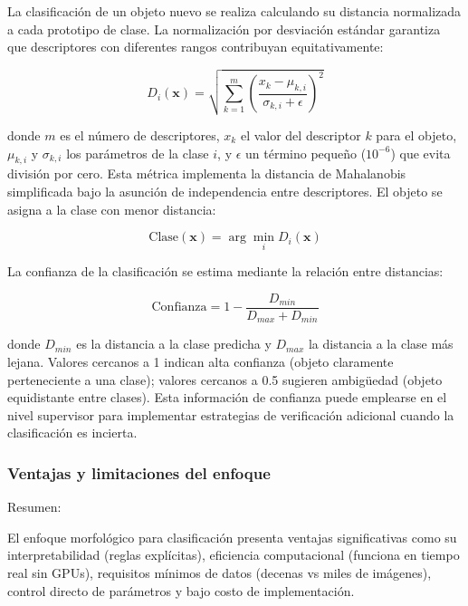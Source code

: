 La clasificación de un objeto nuevo se realiza calculando su distancia normalizada a cada prototipo de clase. La normalización por desviación estándar garantiza que descriptores con diferentes rangos contribuyan equitativamente:

\begin{equation}
D_i(\mathbf{x}) = \sqrt{\sum_{k=1}^{m} \left(\frac{x_k - \mu_{k,i}}{\sigma_{k,i} + \epsilon}\right)^2}
\end{equation}

donde $m$ es el número de descriptores, $x_k$ el valor del descriptor $k$ para el objeto, $\mu_{k,i}$ y $\sigma_{k,i}$ los parámetros de la clase $i$, y $\epsilon$ un término pequeño ($10^{-6}$) que evita división por cero. Esta métrica implementa la distancia de Mahalanobis simplificada bajo la asunción de independencia entre descriptores. El objeto se asigna a la clase con menor distancia:

\begin{equation}
\text{Clase}(\mathbf{x}) = \arg\min_{i} D_i(\mathbf{x})
\end{equation}

La confianza de la clasificación se estima mediante la relación entre distancias:

\begin{equation}
\text{Confianza} = 1 - \frac{D_{min}}{D_{max} + D_{min}}
\end{equation}

donde $D_{min}$ es la distancia a la clase predicha y $D_{max}$ la distancia a la clase más lejana. Valores cercanos a 1 indican alta confianza (objeto claramente perteneciente a una clase); valores cercanos a 0.5 sugieren ambigüedad (objeto equidistante entre clases). Esta información de confianza puede emplearse en el nivel supervisor para implementar estrategias de verificación adicional cuando la clasificación es incierta.

\subsubsection{Ventajas y limitaciones del enfoque}

Resumen:

El enfoque morfológico para clasificación presenta ventajas significativas como su interpretabilidad (reglas explícitas), eficiencia computacional (funciona en tiempo real sin GPUs), requisitos mínimos de datos (decenas vs miles de imágenes), control directo de parámetros y bajo costo de implementación.

